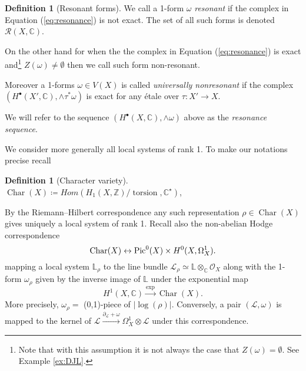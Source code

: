 \documentclass[11pt,reqno]{amsart}
\theoremstyle{definition}
\newtheorem{definition}[theorem]{Definition}
\theoremstyle{remark}
\theoremstyle{cited}
\theoremstyle{citeddef}
\newcommand{\C}{\mathbb{C}}
\DeclareMathOperator{\Char}{Char}
\def\Pic{{\rm Pic}}
\newcommand{\sL}{\mathcal{L}}
\newcommand{\sO}{\mathcal{O}}
\newcommand{\sR}{\mathcal{R}}
\newcommand{\bbC}{\mathbb{C}}
\newcommand{\bbL}{\mathbb{L}}
\newcommand{\bbZ}{\mathbb{Z}}
\DeclareMathOperator{\torsion}{torsion}
\begin{document}
\begin{definition}[Resonant forms]\label{def:resonance}
We call a 1-form $\omega$ \emph{resonant} if the complex 
in Equation (\ref{eq:resonance}) is not exact. The set of all such forms 
is denoted $\sR(X,\bbC)$.

On the other hand for when the the complex 
in Equation (\ref{eq:resonance}) is exact and\footnote{Note that
with this assumption it is not always the case that $Z(\omega) = \emptyset$. See Example \ref{ex:DJL}.} 
$Z(\omega) \neq \emptyset$ then we call such form non-resonant. 

Moreover a 1-forms $\omega\in V(X)$ is called \emph{universally nonresonant} if the complex
\newline $(H^{\bullet}(X',\bbC), \wedge\tau^*\omega)$
 is exact for any \'etale over $\tau\colon X'\to X$. 

We will refer to the sequence $(H^{\bullet}(X,\bbC), \wedge\omega)$ above as the \emph{resonance sequence}.
\end{definition}

We consider more generally all local systems of rank 1. To make our notations precise recall 
\begin{definition}[Character variety]
$\Char(X) \coloneqq Hom(H_1(X, \bbZ)/\torsion, \bbC^{\star})$, 
\end{definition}
By the Riemann--Hilbert correspondence any such representation $\rho\in \Char(X)$ 
gives uniquely a local system of rank 1. 
Recall also the non-abelian Hodge
correspondence
\[\Char(X) \leftrightarrow \Pic^{0}(X)\times H^0(X,\Omega_X^1).\]
mapping a local system $\bbL_{\rho}$ to the line bundle $\sL_{\rho}\simeq \bbL\otimes_{\bbC}\sO_X$
along with the 1-form $\omega_{\rho}$ given by the inverse image of $\bbL$ under
the exponential map
\begin{equation}
H^1(X,\bbC) \xrightarrow{\exp} \Char(X).
\label{eq:exponential}
\end{equation}
More precisely, $\omega_{\rho} = $ (0,1)-piece of $|\log(\rho)|$. Conversely, a pair $(\sL, \omega)$ 
is mapped to the kernel of $\sL\xrightarrow{\partial_{\sL}+\omega} \Omega_X^1\otimes \sL$ under this correspondence.
\end{document}
